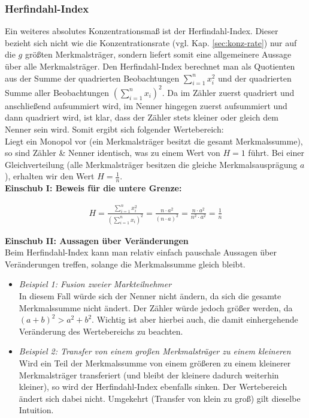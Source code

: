 \documentclass[a4paper]{article}
\begin{document}
\subsubsection{Herfindahl-Index}
Ein weiteres absolutes Konzentrationsmaß ist der Herfindahl-Index. Dieser bezieht sich nicht wie die Konzentrationsrate (vgl. Kap. \ref{sec:konz-rate}) nur auf die $g$ größten Merkmalsträger, sondern liefert somit eine allgemeinere Aussage über alle Merkmalsträger. Den Herfindahl-Index berechnet man als Quotienten aus der Summe der quadrierten Beobachtungen $\sum_{i=1}^n x_i^2$ und der quadrierten Summe aller Beobachtungen $(\sum_{i=1}^n x_i)^2$. Da im Zähler zuerst quadriert und anschließend aufsummiert wird, im Nenner hingegen zuerst aufsummiert und dann quadriert wird, ist klar, dass der Zähler stets kleiner oder gleich dem Nenner sein wird. Somit ergibt sich folgender Wertebereich:\\
Liegt ein Monopol vor (ein Merkmalsträger besitzt die gesamt Merkmalssumme), so sind Zähler \& Nenner identisch, was zu einem Wert von $H = 1$ führt. Bei einer Gleichverteilung (alle Merkmalsträger besitzen die gleiche Merkmalsausprägung $a$), erhalten wir den Wert $H = \frac{1}{n}$.\\

\noindent \textbf{Einschub I: Beweis für die untere Grenze:}

\begin{align*}
H =\frac{\sum_{i=1}^n x_i^2}{(\sum_{i=1}^n x_i)^2} = \frac{n \cdot a^2}{(n \cdot a)^2} = \frac{n \cdot a^2}{n^2 \cdot a^2} = \frac{1}{n}
\end{align*}

\noindent \textbf{Einschub II: Aussagen über Veränderungen}\\
Beim Herfindahl-Index kann man relativ einfach pauschale Aussagen über Veränderungen treffen, solange die Merkmalssumme gleich bleibt.
\begin{itemize}
    \item \textit{Beispiel 1: Fusion zweier Markteilnehmer}\\
    In diesem Fall würde sich der Nenner nicht ändern, da sich die gesamte Merkmalssumme nicht ändert. Der Zähler würde jedoch größer werden, da $(a + b)^2 > a^2 + b^2$. Wichtig ist aber hierbei auch, die damit einhergehende Veränderung des Wertebereichs zu beachten.
    \item \textit{Beispiel 2: Transfer von einem großen Merkmalsträger zu einem kleineren}\\
    Wird ein Teil der Merkmalssumme von einem größeren zu einem kleinerer Merkmalsträger transferiert (und bleibt der kleinere dadurch weiterhin kleiner), so wird der Herfindahl-Index ebenfalls sinken. Der Wertebereich ändert sich dabei nicht. Umgekehrt (Transfer von klein zu groß) gilt dieselbe Intuition.
\end{itemize}
\end{document}
